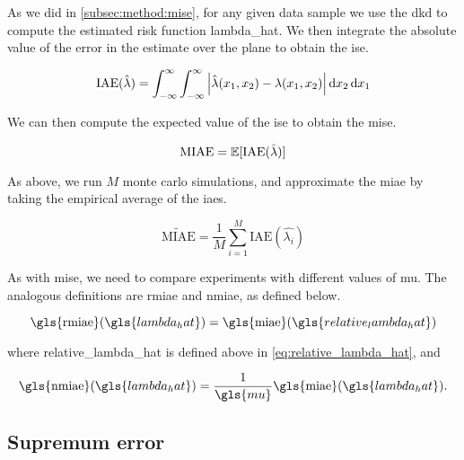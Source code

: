 As we did in \autoref{subsec:method:mise}, for any given data sample we use the \gls{dkd} to compute the estimated risk function \gls{lambda_hat}.
We then integrate the absolute value of the error in the estimate over the plane to obtain the \gls{ise}.

\begin{equation}
    \mbox{IAE}(\hat{\lambda}) = 
        \int_{-\infty}^{\infty} \int_{-\infty}^{\infty}
            \left|
                \hat{\lambda}(x_1, x_2) - \lambda(x_1, x_2)
            \right| \mathop{}\!\mathrm{d}{x_2} \mathop{}\!\mathrm{d}{x_1}
\end{equation}

We can then compute the expected value of the \gls{ise} to obtain the \gls{mise}.

\begin{equation}
    \mbox{MIAE} = \mathbb{E} [\mbox{IAE}(\hat{\lambda})]
\end{equation}

As above, we run \(M\) monte carlo simulations,
and approximate the \gls{miae} by taking the empirical average of the \glspl{iae}.

\begin{equation}
    \widetilde{\mbox{MIAE}} = \frac{1}{M} \sum_{i=1}^{M} \mbox{IAE}(\hat{\lambda_i})
\end{equation}

As with \gls{mise}, we need to compare experiments with different values of \gls{mu}.
The analogous definitions are \gls{rmiae} and \gls{nmiae}, as defined below.

\begin{equation}
\label{eq:rmiae}
    \mbox{\gls{rmiae}}(\gls{lambda_hat}) = 
        \mbox{\gls{miae}}(\gls{relative_lambda_hat}) \\
\end{equation}

where \gls{relative_lambda_hat} is defined above in \cref{eq:relative_lambda_hat},
and

\begin{equation}
\label{eq:nmiae}
    \mbox{\gls{nmiae}}(\gls{lambda_hat}) = 
        \frac{1}{\gls{mu}} \mbox{\gls{miae}}(\gls{lambda_hat}) \text{.}
\end{equation}


\subsection{Supremum error}
\label{subsec:method:sup_error}

